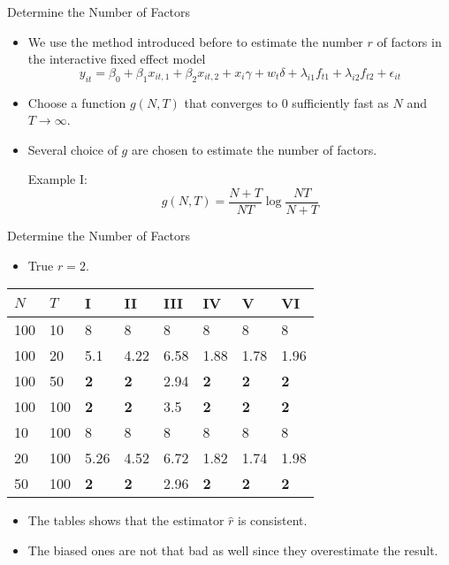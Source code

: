 \documentclass{beamer}
\begin{document}
\begin{frame}{Determine the Number of Factors}
\begin{itemize}
    \item We use the method introduced before to estimate the number $r$ of factors in the interactive fixed effect model  $$
y_{it} = \beta_{0}+ \beta_{1}x_{it,1}+\beta_{2}x_{it,2}+x_{i}\gamma +w_{t}\delta +\lambda_{i1}f_{t1}+\lambda_{i2}f_{t2}+\epsilon_{it}
$$
 \item Choose a function $g(N,T)$ that converges to 0 sufficiently fast as $N$ and $T \to \infty$.
\item Several choice of $g$ are chosen to estimate the number of factors.

Example I:
\[
g(N,T)=\frac{N+T}{NT}\log\frac{NT}{N+T}
\]
\end{itemize}
\end{frame}


\begin{frame}{Determine the Number of Factors}

\begin{itemize}
    \item True $r=2$.
\end{itemize}

    \begin{table}[]
\begin{tabular}{l|l|l|l|l|l|l|l}
\hline
$N$ & $T$ & I & II & III & IV & V & VI \\ \hline
100 & 10 & 8 & 8 & 8 & 8 & 8 & 8 \\ \hline
100 & 20 & 5.1 & 4.22 & 6.58 & 1.88 & 1.78 & 1.96 \\ \hline
100 & 50 & \textbf{2} & \textbf 2 & 2.94 & \textbf2 & \textbf2 & \textbf2 \\ \hline
100 & 100 & \textbf2 & \textbf2 & 3.5 & \textbf2 & \textbf2 & \textbf2 \\ \hline
10 & 100 & 8 & 8 & 8 & 8 & 8 & 8 \\ \hline
20 & 100 & 5.26 & 4.52 & 6.72 & 1.82 & 1.74 & 1.98 \\ \hline
50 & 100 & \textbf2 & \textbf2 & 2.96 & \textbf2 & \textbf2 & \textbf2 \\ \hline
\end{tabular}
\end{table}

\begin{itemize}

    \item The tables shows that the estimator $\hat r$ is consistent.
    \item The biased ones are not that bad as well since they overestimate the result.
\end{itemize}

\end{frame}
\end{document}
